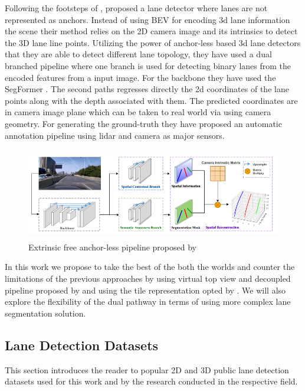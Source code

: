 Following the footsteps of \cite{DBLP:journals/corr/abs-2011-01535}, \cite{yan2022once} proposed a lane detector where lanes are not represented as anchors. Instead of using BEV for encoding 3d lane information the scene their method relies on the 2D camera image and its intrinsics to detect the 3D lane line points. Utilizing the power of anchor-less based 3d lane detectors that they are able to detect different lane topology, they have used a dual branched pipeline where one branch is used for detecting binary lanes from the encoded features from a input image. For the backbone they have used the SegFormer \cite{DBLP:journals/corr/abs-2105-15203}. The second paths regresses directly the 2d coordinates of the lane points along with the depth associated with them. The predicted coordinates are in camera image plane which can be taken to real world via using camera geometry. For generating the ground-truth they have proposed an automatic annotation pipeline using lidar and camera as major sensors.

\begin{figure}[h]
    \centering
\includegraphics[width=12cm, height=4cm]{images/once_pipeline.png}
    \caption{Extrinsic free anchor-less pipeline proposed by \cite{yan2022once}}
    \end{figure}

In this work we propose to take the best of the both the worlds and counter the limitations of the previous approaches by using virtual top view and decoupled pipeline proposed by \cite{guo2020gen} and using the tile representation opted by \cite{DBLP:journals/corr/abs-2011-01535}. We will also explore the flexibility of the dual pathway in terms of using more complex lane segmentation solution.

\subsection{Lane Detection Datasets}
This section introduces the reader to popular 2D and 3D public lane detection datasets used for this work and by the research conducted in the respective field. 

